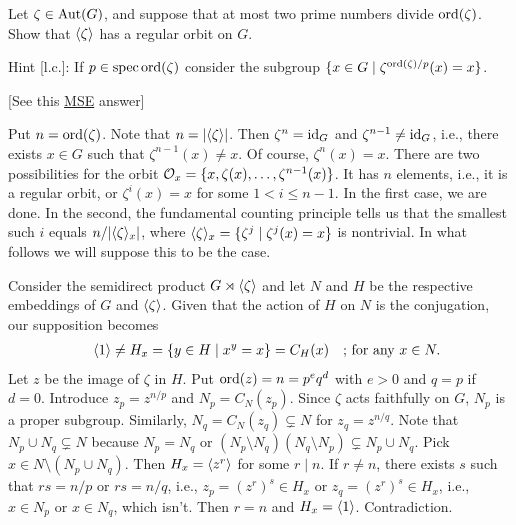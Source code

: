 \begin{solution}
\begin{probl}
    Let\/ $\zeta\in{\rm Aut}(G)$, and suppose that at most two prime numbers divide\/ ${\rm ord}(\zeta)$. Show that\/ $\langle\zeta\rangle$ has a regular orbit on\/ $G$.

    \textrm{\rm Hint [l.c.]: If $p\in\operatorname{spec}{\rm ord}(\zeta)$ consider the subgroup $\{x\in G\mid \zeta^{{\rm ord}(\zeta)/p}(x)=x\}$.}
\end{probl}

\begin{solution} {[See this \href{https://math.stackexchange.com/a/2596610/269050}{MSE} answer]}

Put $n={\rm ord}(\zeta)$. Note that $n=|\langle\zeta\rangle|$. Then $\zeta^n=\operatorname{id}_G$ and $\zeta^{n-1}\ne\operatorname{id}_G$, i.e., there exists $x\in G$ such that $\zeta^{n-1}(x)\ne x$. Of course, $\zeta^n(x)=x$. There are two possibilities for the orbit ${\cal O}_x=\{x,\zeta(x),\dots,\zeta^{n-1}(x)\}$. It has $n$ elements, i.e., it is a regular orbit, or $\zeta^i(x)=x$ for some $1<i\le n-1$. In the first case, we are done. In the second, the fundamental counting principle tells us that the smallest such $i$ equals $n/|\langle\zeta\rangle_x|$, where $\langle\zeta\rangle_x=\{\zeta^j\mid\zeta^j(x)=x\}$ is nontrivial. In what follows we will suppose this to be the case.

Consider the semidirect product $G\rtimes\langle\zeta\rangle$ and let $N$ and $H$ be the respective embeddings of $G$ and $\langle\zeta\rangle$. Given that the action of $H$ on $N$ is the conjugation, our supposition becomes
\begin{align*}
    &\qquad\langle1\rangle\ne H_x = \{y\in H\mid x^y=x\}=C_H(x)&&\text{; for any }x\in N.
\end{align*}
Let $z$ be the image of $\zeta$ in $H$. Put ${\rm ord}(z)=n=p^eq^d$ with $e>0$ and $q=p$ if $d=0$. Introduce $z_p=z^{n/p}$ and $N_p=C_N(z_p)$. Since $\zeta$ acts faithfully on $G$, $N_p$ is a proper subgroup. Similarly, $N_q=C_N(z_q)\varsubsetneq N$ for $z_q=z^{n/q}$. Note that $N_p\cup N_q\varsubsetneq N$ because $N_p=N_q$ or $(N_p\setminus N_q)(N_q\setminus N_p)\varsubsetneq N_p\cup N_q$. Pick $x\in N\setminus(N_p\cup N_q)$. Then $H_x=\langle z^r\rangle$ for some $r\mid n$. If $r\ne n$, there exists $s$ such that $rs=n/p$ or $rs=n/q$, i.e., $z_p=(z^r)^s\in H_x$ or $z_q=(z^r)^s\in H_x$, i.e., $x\in N_p$ or $x\in N_q$, which isn't. Then $r=n$ and $H_x=\langle1\rangle$. Contradiction.  \end{solution}


\end{solution}
